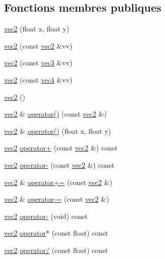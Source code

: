 \subsection*{Fonctions membres publiques}
\begin{DoxyCompactItemize}
\item 
\hyperlink{structvec2_a9486933da4d4d819a8b99bae91066cb3}{vec2} (float x, float y)
\item 
\hyperlink{structvec2_afc5a96fc403a9d8fd7e5d68bff5d29b7}{vec2} (const \hyperlink{structvec2}{vec2} \&vv)
\item 
\hyperlink{structvec2_ad91c5434ac0e8f28fbe003eb502794b4}{vec2} (const \hyperlink{structvec3}{vec3} \&vv)
\item 
\hyperlink{structvec2_a176b35e8578714444c9342c02e340d8f}{vec2} (const \hyperlink{structvec4}{vec4} \&vv)
\item 
\hyperlink{structvec2_ae12a1a221eca3561809600a11b58eaa3}{vec2} ()
\item 
\hyperlink{structvec2}{vec2} \& \hyperlink{structvec2_a7dbfc0907d75affde43a93268ffae3c6}{operator()} (const \hyperlink{structvec2}{vec2} \&)
\item 
\hyperlink{structvec2}{vec2} \& \hyperlink{structvec2_afd219b1a459e076b93f982eaed8d997c}{operator()} (float x, float y)
\item 
\hyperlink{structvec2}{vec2} \hyperlink{structvec2_af87b31cf8030bc55527b1107452ee5e9}{operator+} (const \hyperlink{structvec2}{vec2} \&) const 
\item 
\hyperlink{structvec2}{vec2} \hyperlink{structvec2_a68164358471bdcb3417869db193552bf}{operator-\/} (const \hyperlink{structvec2}{vec2} \&) const 
\item 
\hyperlink{structvec2}{vec2} \& \hyperlink{structvec2_a48fb5bd662a4d3ccd986747f20ea635d}{operator+=} (const \hyperlink{structvec2}{vec2} \&)
\item 
\hyperlink{structvec2}{vec2} \& \hyperlink{structvec2_adc2158607a6d462f8d1cc122fafdcced}{operator-\/=} (const \hyperlink{structvec2}{vec2} \&)
\item 
\hyperlink{structvec2}{vec2} \hyperlink{structvec2_a61720fc43c67b57ca581e96ee5a95cc8}{operator-\/} (void) const 
\item 
\hyperlink{structvec2}{vec2} \hyperlink{structvec2_a92e02c3c972fadef2442cd8dcdfe422d}{operator$\ast$} (const float) const 
\item 
\hyperlink{structvec2}{vec2} \hyperlink{structvec2_a47810ee0188ae05307e8b73f9164448f}{operator/} (const float) const 
\item 

\end{DoxyCompactItemize}
